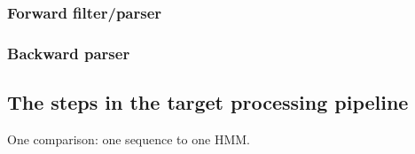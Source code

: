 \subsubsection{Forward filter/parser}

\subsubsection{Backward parser}





\subsection{The steps in the target processing pipeline}

One comparison: one sequence to one HMM.

